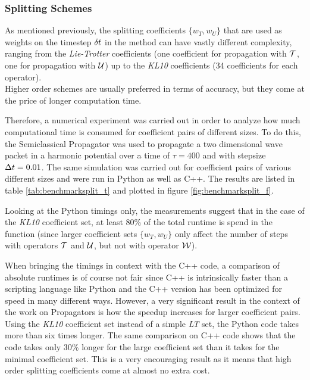\subsubsection{Splitting Schemes}
%
As mentioned previously, the splitting coefficients $\{ w_T, w_U \}$ that are used as weights on the timestep $\delta t$ in the  method can have vastly different complexity, ranging from the \emph{Lie-Trotter} coefficients (one coefficient for propagation with $\mathcal{T}$, one for propagation with $\mathcal{U}$) up to the \emph{KL10} coefficients (34 coefficients for each operator). \\
Higher order schemes are usually preferred in terms of accuracy, but they come at the price of longer computation time.
\par\medskip
%
Therefore, a numerical experiment was carried out in order to analyze how much computational time is consumed for coefficient pairs of different sizes.
To do this, the Semiclassical Propagator was used to propagate a two dimensional wave packet in a harmonic potential over a time of $\tau = 400$ and with stepsize $\Delta t = 0.01$.
The same simulation was carried out for coefficient pairs of various different sizes and were run in Python as well as C++.
The results are listed in table \ref{tab:benchmarksplit_t} and plotted in figure \ref{fig:benchmarksplit_f}.
\par\medskip
%
Looking at the Python timings only, the measurements suggest that in the case of the \emph{KL10} coefficient set, at least 80\% of the total runtime is spend in the  function (since larger coefficient sets $\{ w_T, w_U \}$ only affect the number of steps with operators $\mathcal{T}$ and $\mathcal{U}$, but not with operator $\mathcal{W}$).
\par\medskip
%
When bringing the timings in context with the C++ code, a comparison of absolute runtimes is of course not fair since C++ is intrinsically faster than a scripting language like Python and the C++ version has been optimized for speed in many different ways.
However, a very significant result in the context of the work on Propagators is how the speedup increases for larger coefficient pairs.
Using the \emph{KL10} coefficient set instead of a simple \emph{LT} set, the Python code takes more than six times longer.
The same comparison on C++ code shows that the code takes only 30\% longer for the large coefficient set than it takes for the minimal coefficient set.
This is a very encouraging result as it means that high order splitting coefficients come at almost no extra cost.
\par\medskip
